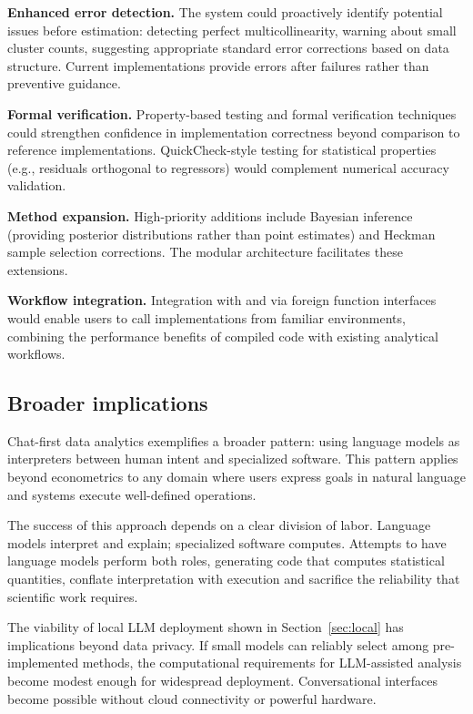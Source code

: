 \textbf{Enhanced error detection.} The system could proactively identify
potential issues before estimation: detecting perfect multicollinearity,
warning about small cluster counts, suggesting appropriate standard error
corrections based on data structure. Current implementations provide errors
after failures rather than preventive guidance.

\textbf{Formal verification.} Property-based testing and formal verification
techniques could strengthen confidence in implementation correctness beyond
comparison to reference implementations. QuickCheck-style testing for statistical
properties (e.g., residuals orthogonal to regressors) would complement
numerical accuracy validation.

\textbf{Method expansion.} High-priority additions include Bayesian inference
(providing posterior distributions rather than point estimates) and Heckman
sample selection corrections. The modular architecture facilitates these
extensions.

\textbf{Workflow integration.} Integration with  and 
via foreign function interfaces would enable users to call 
implementations from familiar environments, combining the performance benefits
of compiled code with existing analytical workflows.

\subsection{Broader implications}

Chat-first data analytics exemplifies a broader pattern: using
language models as interpreters between human intent and specialized software.
This pattern applies beyond econometrics to any domain where users express goals
in natural language and systems execute well-defined operations.

The success of this approach depends on a clear division of labor. Language
models interpret and explain; specialized software computes. Attempts to
have language models perform both roles, generating code that computes
statistical quantities, conflate interpretation with execution and sacrifice
the reliability that scientific work requires.

The viability of local LLM deployment shown in Section~\ref{sec:local}
has implications beyond data privacy. If small models can reliably select among
pre-implemented methods, the computational requirements for LLM-assisted analysis
become modest enough for widespread deployment. Conversational interfaces
become possible without cloud connectivity or powerful hardware.

